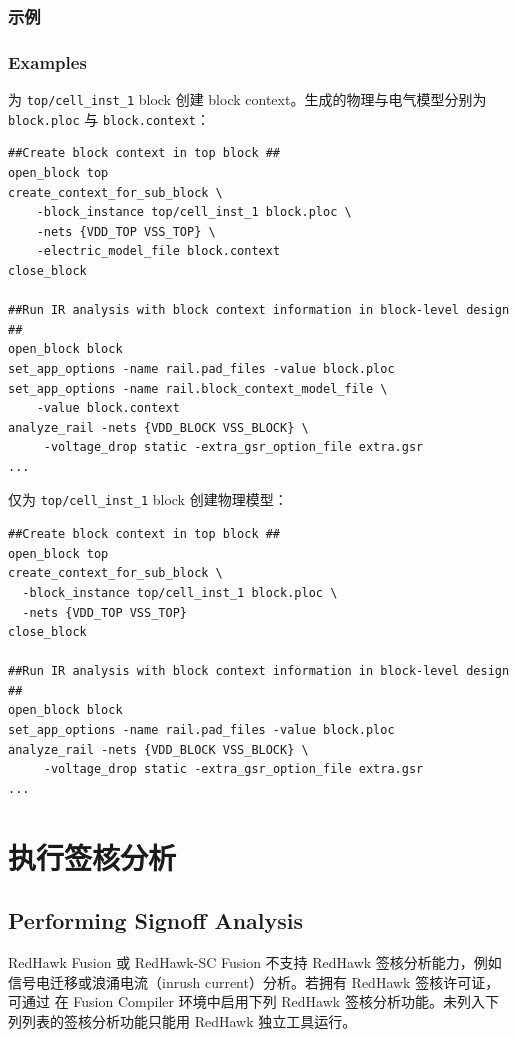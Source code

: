 \subsubsection{示例}
\subsubsection*{Examples}

为 \texttt{top/cell\_inst\_1} block 创建 block context。生成的物理与电气模型分别为 \texttt{block.ploc} 与 \texttt{block.context}：
\begin{lstlisting}
##Create block context in top block ##
open_block top
create_context_for_sub_block \
    -block_instance top/cell_inst_1 block.ploc \
    -nets {VDD_TOP VSS_TOP} \
    -electric_model_file block.context
close_block

##Run IR analysis with block context information in block-level design ##
open_block block
set_app_options -name rail.pad_files -value block.ploc
set_app_options -name rail.block_context_model_file \
    -value block.context
analyze_rail -nets {VDD_BLOCK VSS_BLOCK} \
     -voltage_drop static -extra_gsr_option_file extra.gsr
...
\end{lstlisting}

仅为 \texttt{top/cell\_inst\_1} block 创建物理模型：
\begin{lstlisting}
##Create block context in top block ##
open_block top
create_context_for_sub_block \
  -block_instance top/cell_inst_1 block.ploc \
  -nets {VDD_TOP VSS_TOP}
close_block

##Run IR analysis with block context information in block-level design ##
open_block block
set_app_options -name rail.pad_files -value block.ploc
analyze_rail -nets {VDD_BLOCK VSS_BLOCK} \
     -voltage_drop static -extra_gsr_option_file extra.gsr
...
\end{lstlisting}

\section{执行签核分析}
\subsection*{Performing Signoff Analysis}

RedHawk Fusion 或 RedHawk-SC Fusion 不支持 RedHawk 签核分析能力，例如信号电迁移或浪涌电流（inrush current）分析。若拥有 RedHawk 签核许可证，可通过  在 Fusion Compiler 环境中启用下列 RedHawk 签核分析功能。未列入下列列表的签核分析功能只能用 RedHawk 独立工具运行。

